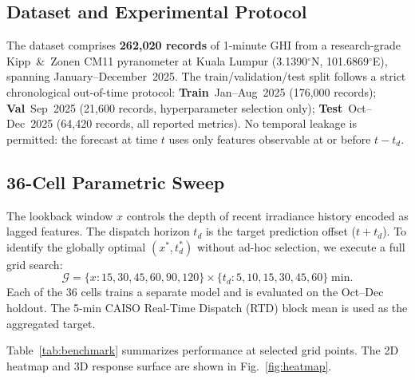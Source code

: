 \documentclass[conference]{IEEEtran}
\begin{document}
\subsection{Dataset and Experimental Protocol}

The dataset comprises \textbf{262,020 records} of 1-minute GHI from a
research-grade Kipp~\&~Zonen CM11 pyranometer at Kuala Lumpur
(3.1390$^{\circ}$N, 101.6869$^{\circ}$E), spanning January--December~2025.
The train/validation/test split follows a strict chronological out-of-time
protocol: \textbf{Train}~Jan--Aug~2025 (176,000 records); \textbf{Val}~Sep~2025
(21,600 records, hyperparameter selection only);
\textbf{Test}~Oct--Dec~2025 (64,420 records, all reported metrics).
No temporal leakage is permitted: the forecast at time $t$ uses only features
observable at or before $t-t_d$.

\subsection{36-Cell Parametric Sweep}

The lookback window $x$ controls the depth of recent irradiance history encoded
as lagged features. The dispatch horizon $t_d$ is the target prediction offset
($t+t_d$). To identify the globally optimal $(x^{*},t_d^{*})$ without ad-hoc
selection, we execute a full grid search:
\begin{equation}
  \mathcal{G} = \{x : 15,30,45,60,90,120\}
    \times \{t_d : 5,10,15,30,45,60\}\;\mathrm{min}.
  \label{eq:grid}
\end{equation}
Each of the 36 cells trains a separate model and is evaluated on the Oct--Dec
holdout. The 5-min CAISO Real-Time Dispatch (RTD) block mean is used as the
aggregated target.

Table~\ref{tab:benchmark} summarizes performance at selected grid points.
The 2D heatmap and 3D response surface are shown in Fig.~\ref{fig:heatmap}.
\end{document}
